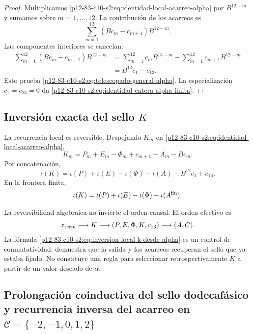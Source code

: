 \begin{proof}
Multiplicamos \eqref{p12-83-c10-s2:eq:identidad-local-acarreo-alpha} por
\(B^{12-m}\) y sumamos sobre \(m=1,\ldots,12\). La contribución de los
acarreos es
\[
 \sum_{m=1}^{12}
 (Bc_m-c_{m+1})B^{12-m}.
\]
Las componentes interiores se cancelan:
\begin{align*}
 \sum_{m=1}^{12}(Bc_m-c_{m+1})B^{12-m}
 &=\sum_{m=1}^{12}c_mB^{13-m}
   -\sum_{m=1}^{12}c_{m+1}B^{12-m}\\
 &=B^{12}c_1-c_{13}.
\end{align*}
Esto prueba \eqref{p12-83-c10-s2:eq:telescopado-general-alpha}. La especialización
\(c_1=c_{13}=0\) da \eqref{p12-83-c10-s2:eq:identidad-entera-alpha-finita}.
\end{proof}

\subsection{Inversión exacta del sello \texorpdfstring{\(K\)}{K}}

La recurrencia local es reversible. Despejando \(K_m\) en
\eqref{p12-83-c10-s2:eq:identidad-local-acarreo-alpha},
\begin{equation}
 \boxed{
 K_m=P_m+E_m-\Phi_m+c_{m+1}-A_m-Bc_m.}
 \label{p12-83-c10-s2:eq:inversion-local-k-desde-alpha}
\end{equation}
Por concatenación,
\begin{equation}
 \boxed{
 \iota(K)
 =\iota(P)+\iota(E)-\iota(\Phi)-\iota(A)
  -B^{12}c_1+c_{13}.}
 \label{p12-83-c10-s2:eq:inversion-concatenada-k-desde-alpha}
\end{equation}
En la frontera finita,
\[
 \iota(K)
 =\iota(P)+\iota(E)-\iota(\Phi)-\iota(A^{\rm fin}).
\]

La reversibilidad algebraica no invierte el orden causal. El orden efectivo
es
\[
 x_{\rm term}
 \longrightarrow K
 \longrightarrow(P,E,\Phi,K,c_{13})
 \longrightarrow(A,C).
\]
La fórmula \eqref{p12-83-c10-s2:eq:inversion-local-k-desde-alpha} es un control de
conmutatividad: demuestra que la salida y los acarreos recuperan el sello
que ya estaba fijado. No constituye una regla para seleccionar
retrospectivamente \(K\) a partir de un valor deseado de \(\alpha\).

\subsection{Prolongación coinductiva del sello dodecafásico y recurrencia inversa del acarreo en \(\mathcal C=\{-2,-1,0,1,2\}\)}

